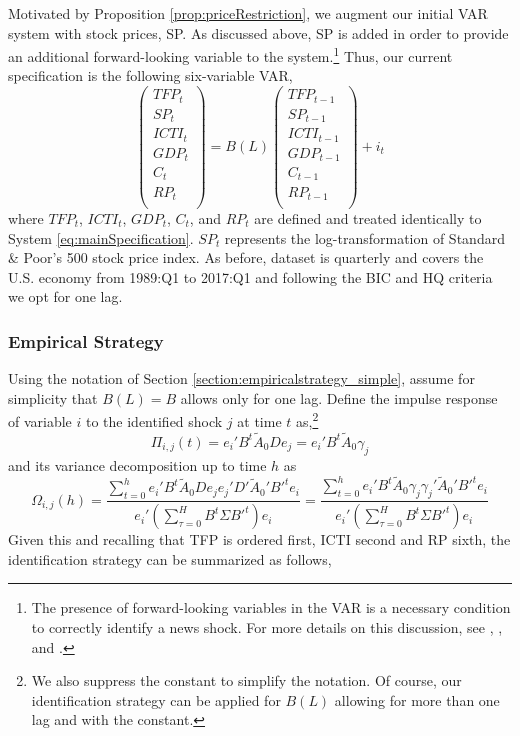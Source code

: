 \documentclass[12pt]{article}
\begin{document}
Motivated by Proposition \ref{prop:priceRestriction}, we augment our initial VAR system with stock prices, SP. As discussed above, SP is added in order to provide an additional forward-looking variable to the system.\footnote{The presence of forward-looking variables in the VAR is a necessary condition to correctly identify a news shock. For more details on this discussion, see \cite{sims2012news}, \cite{forni2014sufficient}, and \cite{barsky2015whither}.} Thus, our current specification is the following six-variable VAR,
\begin{equation}\label{eq:newsSpecification}
\begin{pmatrix}
TFP_t \\ 
SP_t \\
ICTI_t \\
GDP_t \\
C_t \\
RP_t \\
\end{pmatrix} = B(L) \begin{pmatrix}
TFP_{t-1} \\ 
SP_{t-1} \\
ICTI_{t-1} \\
GDP_{t-1} \\
C_{t-1} \\
RP_{t-1} \\
\end{pmatrix} + i_t
\end{equation}
where $TFP_t$, $ICTI_t$, $GDP_t$, $C_t$, and $RP_t$ are defined and treated identically to System \ref{eq:mainSpecification}. $SP_t$ represents the log-transformation of Standard \& Poor's 500 stock price index.  As before, dataset is quarterly and covers the U.S. economy from 1989:Q1 to 2017:Q1 and following the BIC and HQ criteria we opt for one lag.

\subsubsection*{Empirical Strategy}

Using the notation of Section \ref{section:empiricalstrategy_simple}, assume for simplicity that $B(L) = B$ allows only for one lag. Define the impulse response of variable $i$ to the identified shock $j$ at time $t$ as,\footnote{We also suppress the constant to simplify the notation. Of course, our identification strategy can be applied for $B(L)$ allowing for more than one lag and with the constant.}
$$
\Pi_{i,j}(t) = e_i' B^t \tilde{A}_0 D e_j = e_i' B^t \tilde{A}_0 \gamma_j
$$
and its variance decomposition up to time $h$ as
$$
\Omega_{i,j}(h) = \frac{ \sum_{t=0}^h e_i' B^t \tilde{A}_0 D e_j e_j' D' \tilde{A}_0' B'^t e_i } {e_i'( \sum_{\tau = 0}^H B^t \Sigma B'^t )e_i} = \frac{ \sum_{t=0}^h e_i' B^t \tilde{A}_0 \gamma_j \gamma_j' \tilde{A}_0' B'^t e_i } {e_i'( \sum_{\tau = 0}^H B^t \Sigma B'^t )e_i}
$$
Given this and recalling that TFP is ordered first, ICTI second and RP sixth, the identification strategy can be summarized as follows,
\end{document}
